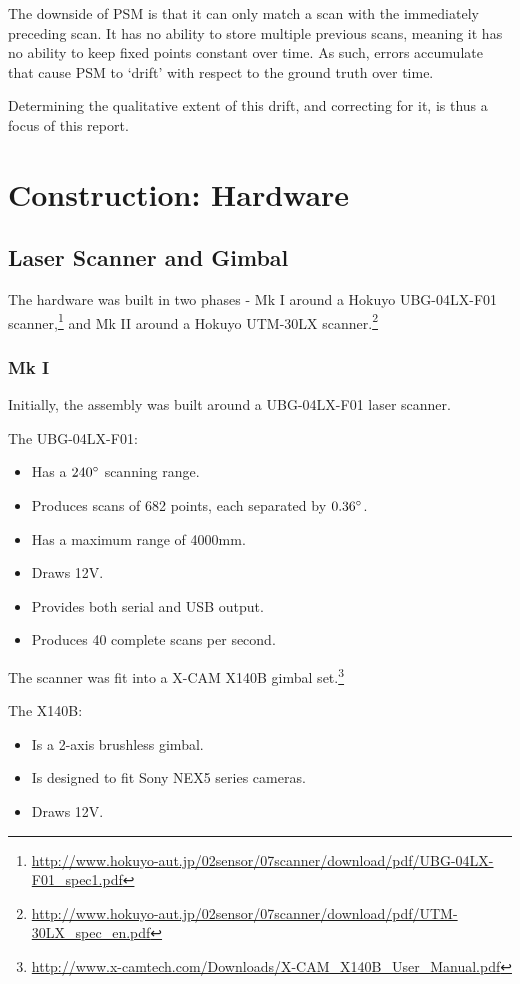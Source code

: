 \documentclass[12pt,oneside,a4paper]{book}
\begin{document}
The downside of PSM is that it can only match a scan with the
immediately preceding scan. It has no ability to store multiple
previous scans, meaning it has no ability to keep fixed points
constant over time. As such, errors accumulate that cause PSM to
`drift' with respect to the ground truth over time.

Determining the qualitative extent of this drift, and correcting for
it, is thus a focus of this report.

\chapter{Construction: Hardware}
\label{sec:hardware}

\section{Laser Scanner and Gimbal}
\label{sec:laser-scanner-gimbal}

The hardware was built in two phases - Mk I around a Hokuyo
UBG-04LX-F01
scanner,\footnote{\url{http://www.hokuyo-aut.jp/02sensor/07scanner/download/pdf/UBG-04LX-F01_spec1.pdf}}
and Mk II around a Hokuyo UTM-30LX scanner.\footnote{\url{http://www.hokuyo-aut.jp/02sensor/07scanner/download/pdf/UTM-30LX_spec_en.pdf}}


\subsection{Mk I}
\label{sec:mk-i}

Initially, the assembly was built around a UBG-04LX-F01 laser
scanner.

The UBG-04LX-F01:
\begin{itemize}
\item Has a $240\degree$ scanning range.
\item Produces scans of 682 points, each separated by $0.36\degree$.
\item Has a maximum range of 4000mm.
\item Draws 12V.
\item Provides both serial and USB output.
\item Produces 40 complete scans per second.
\end{itemize}

The scanner was fit into a X-CAM X140B gimbal set.\footnote{\url{http://www.x-camtech.com/Downloads/X-CAM_X140B_User_Manual.pdf}}

The X140B:
\begin{itemize}
\item Is a 2-axis brushless gimbal.
\item Is designed to fit Sony NEX5 series cameras.
\item Draws 12V.
\end{itemize}
\end{document}
